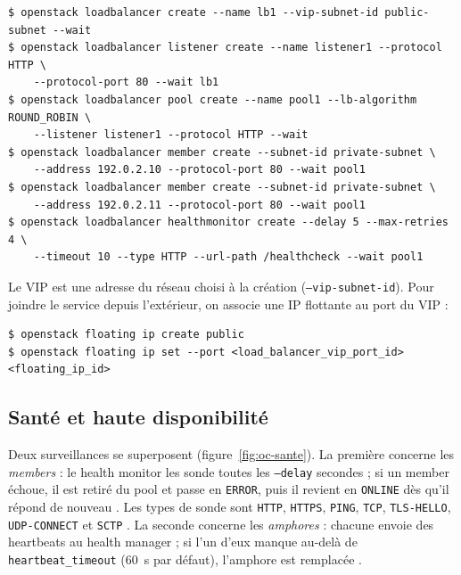 \par\noindent\begin{minipage}{\linewidth}
\begin{lstlisting}[style=terminal]
$ openstack loadbalancer create --name lb1 --vip-subnet-id public-subnet --wait
$ openstack loadbalancer listener create --name listener1 --protocol HTTP \
    --protocol-port 80 --wait lb1
$ openstack loadbalancer pool create --name pool1 --lb-algorithm ROUND_ROBIN \
    --listener listener1 --protocol HTTP --wait
$ openstack loadbalancer member create --subnet-id private-subnet \
    --address 192.0.2.10 --protocol-port 80 --wait pool1
$ openstack loadbalancer member create --subnet-id private-subnet \
    --address 192.0.2.11 --protocol-port 80 --wait pool1
$ openstack loadbalancer healthmonitor create --delay 5 --max-retries 4 \
    --timeout 10 --type HTTP --url-path /healthcheck --wait pool1
\end{lstlisting}
\end{minipage}\par

Le VIP est une adresse du réseau choisi à la création (\texttt{--vip-subnet-id}). Pour joindre le service depuis
l'extérieur, on associe une IP flottante au port du VIP \parencite{octavia-cookbook} :

\par\noindent\begin{minipage}{\linewidth}
\begin{lstlisting}[style=terminal]
$ openstack floating ip create public
$ openstack floating ip set --port <load_balancer_vip_port_id> <floating_ip_id>
\end{lstlisting}
\end{minipage}\par

\subsection{Santé et haute disponibilité}\label{sec:oc-sante}

Deux surveillances se superposent (figure~\ref{fig:oc-sante}). La première concerne les \emph{members} : le health monitor
les sonde toutes les \texttt{--delay} secondes ; si un member échoue, il est retiré du pool et passe en \texttt{ERROR}, puis
il revient en \texttt{ONLINE} dès qu'il répond de nouveau \parencite{octavia-cookbook}. Les types de sonde sont \texttt{HTTP},
\texttt{HTTPS}, \texttt{PING}, \texttt{TCP}, \texttt{TLS-HELLO}, \texttt{UDP-CONNECT} et \texttt{SCTP}
\parencite{octavia-api-ref}. La seconde concerne les \emph{amphores} : chacune envoie des heartbeats au health manager ;
si l'un d'eux manque au-delà de \texttt{heartbeat\_\allowbreak timeout} (60~s par défaut), l'amphore est remplacée
\parencite{octavia-config}.

